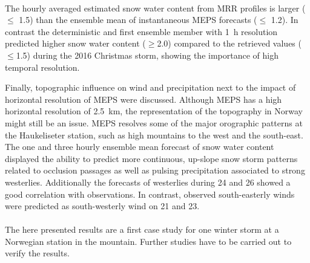 \\
The hourly averaged estimated snow water content from MRR profiles is larger ($\le$ \SI{1.5}{\SWC}) than the ensemble mean of instantaneous MEPS forecasts ($\le$ \SI{1.2}{\SWC}). In contrast the deterministic and first ensemble member with \SI{1}{\hour} resolution predicted higher snow water content ($\ge$\SI{2.0}{\SWC}) compared to the retrieved values ($\le$\SI{1.5}{\SWC}) %
during the 2016 Christmas storm, showing the importance of high temporal resolution.
\par\medskip
\noindent
Finally, topographic influence on wind and precipitation next to the impact of horizontal resolution of MEPS were discussed. 
Although MEPS has a high horizontal resolution of \SI{2.5}{\km}, the representation of the %
topography in Norway might still be an issue. MEPS %
resolves some of the major orographic patterns at the Haukeliseter station, such as high mountains to the west and the south-east. %
The one and three hourly ensemble mean forecast of snow water content displayed the ability to predict more continuous, up-slope snow storm patterns related to occlusion passages as well as pulsing precipitation associated to strong westerlies. Additionally the forecasts of westerlies during \num{24} and \SI{26}{\dec} showed a good correlation with observations. In contrast, observed south-easterly winds were predicted as south-westerly wind on \num{21} and \SI{23}{\dec}. %
\\
\\
The here presented results are a first case study for one winter storm at a Norwegian station in the mountain. Further studies have to be carried out to verify the results.


